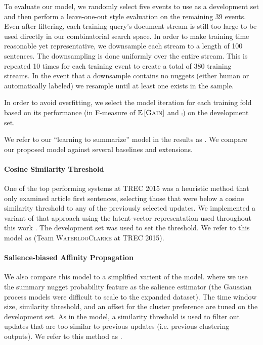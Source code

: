  To evaluate our model, we randomly select five events to use as a
 development set and then perform a leave-one-out style evaluation on the
 remaining 39 events.
 Even after filtering,  each training query's document stream is still too
 large to be used directly in our combinatorial search space. In order to
 make training time reasonable yet representative, we downsample each stream
 to a length of 100 sentences. The downsampling is done uniformly over the
 entire stream. This is repeated 10 times for each training event to create a
 total of 380 training streams. In the event that a downsample contains no
 nuggets (either human or automatically labeled) we resample until at least
 one exists in the sample. 

 In order to avoid overfitting, we select the model iteration for each
 training fold based on its performance (in F-measure of $\mathbb{E}\left[\textsc{Gain}\right]$ and
 $\comp$) on the development set.


 We refer to our ``learning to summarize'' model in the results as 
 \modelLS.
 We compare our proposed model against several baselines and extensions. 

 \paragraph{Cosine Similarity Threshold} One of the top performing systems 
 at TREC 2015 was a heuristic method that only
 examined article first sentences, selecting those that were below a cosine
 similarity threshold to any of the previously selected updates. We
 implemented a variant of that approach using the latent-vector
 representation used throughout this work \citep{guo2012simple}. 
 The development set was used to
 set the threshold. We refer to this model as \modelCos (Team
 \textsc{WaterlooClarke} at TREC 2015).
  
 \paragraph{Salience-biased Affinity Propagation}
 We also compare this model to a simplified varient of the \sap{} model.
where we use the summary
nugget probability feature as the salience estimator (the Gaussian process
models were difficult to scale to the expanded dataset).  The time
 window size, similarity threshold, and an offset for the cluster preference
 are tuned on the development set.
 As in the \modelCos{} model, a
 similarity threshold is used to filter out updates that are too similar to
 previous updates (i.e. previous clustering outputs).    
 We refer to this method as \sap.  

